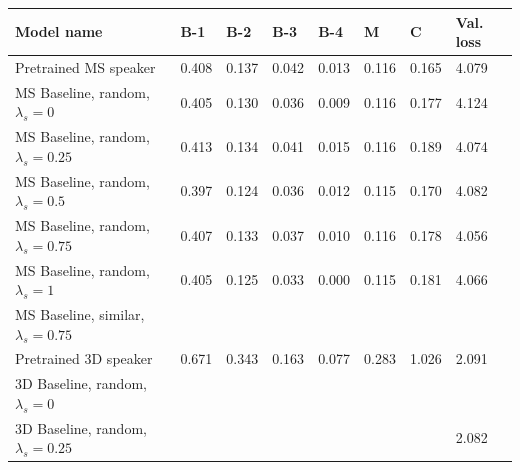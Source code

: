 \begin{table}[]
	\begin{tabularx}{\textwidth}{|X|l|l|l|l|l|l|l|}
		\hline
		\textbf{Model name}                                    & \textbf{B-1} & \textbf{B-2} & \textbf{B-3} & \textbf{B-4} & \textbf{M} & \textbf{C} & \textbf{Val. loss} \\ \hline
		Pretrained MS speaker                             & 0.408           & 0.137           & 0.042           & 0.013           & 0.116           & 0.165          & 4.079                    \\ \hline
		MS Baseline, random, $\lambda_s = 0$      &   0.405              &      0.130           &     0.036            &     0.009            &     0.116            &     0.177           &           4.124               \\ \hline
		MS Baseline, random, $\lambda_s = 0.25$   &          0.413       &       0.134          &      0.041          &       0.015          &       0.116          &       0.189        &           4.074               \\ \hline
		MS Baseline, random, $\lambda_s = 0.5$   &          0.397       &       0.124          &      0.036          &       0.012          &       0.115          &       0.170         &           4.082               \\ \hline
		MS Baseline, random, $\lambda_s = 0.75$   & 0.407           & 0.133           & 0.037           & 0.010           & 0.116           & 0.178          & 4.056                    \\ \hline
		MS Baseline, random, $\lambda_s = 1$   &    0.405             &   0.125              &    0.033             &  0.000              &         0.115        &       0.181         &         4.066                 \\ \hline
		MS Baseline, similar, $\lambda_s = 0.75$  &                 &                 &                 &                 &                 &                &                          \\ \hline
		Pretrained 3D speaker                            & 0.671           & 0.343           & 0.163           & 0.077           & 0.283           & 1.026          & 2.091                    \\ \hline
		3D Baseline, random, $\lambda_s = 0$     &                 &                 &                 &                 &                 &                &                          \\ \hline
		3D Baseline, random, $\lambda_s = 0.25$   &                 &                 &                 &                 &                 &                &          2.082                \\ \hline

\end{tabularx}
\end{table}
